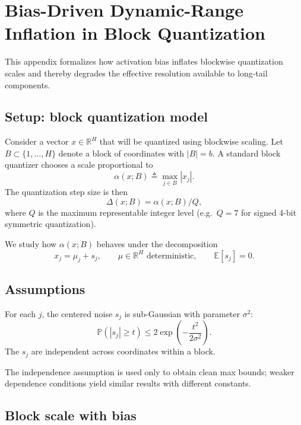 \section{Bias-Driven Dynamic-Range Inflation in Block Quantization}
\label{app:quant_bias}

This appendix formalizes how activation bias inflates blockwise quantization
scales and thereby degrades the effective resolution available to long-tail
components.

\subsection{Setup: block quantization model}

Consider a vector $x\in\mathbb{R}^H$ that will be quantized using blockwise
scaling.
Let $B\subset\{1,\dots,H\}$ denote a block of coordinates with $|B|=b$.
A standard block quantizer chooses a scale proportional to
\begin{equation}
\label{eq:block_scale_max}
\alpha(x;B) \triangleq \max_{j\in B} |x_j|.
\end{equation}
The quantization step size is then
\[
\Delta(x;B) = \alpha(x;B) / Q,
\]
where $Q$ is the maximum representable integer level (e.g.\ $Q=7$ for signed
4-bit symmetric quantization).

We study how $\alpha(x;B)$ behaves under the decomposition
\begin{equation}
\label{eq:x_bias_noise}
x_j = \mu_j + s_j,
\qquad
\mu\in\mathbb{R}^H \text{ deterministic},
\qquad
\mathbb{E}[s_j]=0.
\end{equation}

\subsection{Assumptions}

\begin{assumption}
\label{assump:subg_C}
For each $j$, the centered noise $s_j$ is sub-Gaussian with parameter $\sigma^2$:
\[
\mathbb{P}(|s_j|\ge t)\le 2\exp\!\left(-\frac{t^2}{2\sigma^2}\right).
\]
The $s_j$ are independent across coordinates within a block.
\end{assumption}

The independence assumption is used only to obtain clean max bounds; weaker
dependence conditions yield similar results with different constants.

\subsection{Block scale with bias}

